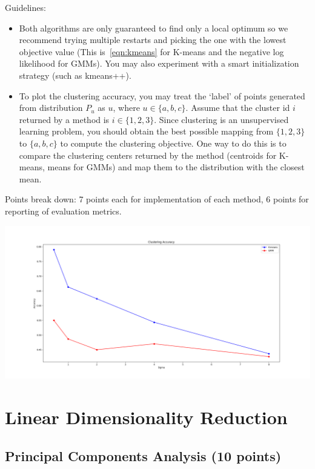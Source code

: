 \documentclass[a4paper]{article}
\newcounter{thm}
\theoremstyle{definition}
\begin{document}
Guidelines:
\begin{itemize}
\item Both algorithms are only guaranteed to find only a local optimum so we recommend trying multiple
restarts and picking the one with the lowest objective value (This is~\eqref{eqn:kmeans} for K-means and the negative log likelihood for GMMs).
You may also experiment with a smart initialization
strategy (such as kmeans++).

\item
To plot the clustering accuracy,  you may treat the `label' of points generated from distribution
$P_u$ as $u$, where $u\in \{a, b, c\}$.
Assume that the cluster id $i$ returned by a method is $i\in \{1, 2, 3\}$.
Since clustering is an unsupervised learning problem, you should obtain the best possible mapping
from $\{1, 2, 3\}$ to $\{a, b, c\}$ to compute the clustering objective.
One way to do this is to compare the clustering centers returned by the method (centroids for
K-means, means for GMMs) and map them to the distribution with the closest mean.

\end{itemize}

Points break down: 7 points each for implementation of each method, 6 points for reporting of
evaluation metrics.


\begin{center}
  \includegraphics[width=\linewidth]{clustering.png}
\end{center}

\section{Linear Dimensionality Reduction}

\subsection{Principal Components Analysis  (10 points)}
\label{sec:pca}
\end{document}
